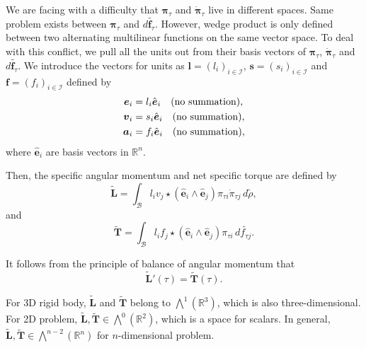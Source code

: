 \documentclass[preprint,12pt]{elsarticle}
\numberwithin{equation}{section}
\renewcommand{\u}[1]{\boldsymbol{#1}}
\renewcommand{\c}[1]{\mathcal{#1}}
\newcommand{\tu}[1]{\tilde{\u{ #1}}}
\begin{document}
We are facing with a difficulty that $\boldsymbol{\pi}_{\tau}$ and $\dot{\boldsymbol{\pi}}_{\tau}$ live in different spaces. Same problem exists between $\boldsymbol{\pi}_{\tau}$ and $d\tilde{\boldsymbol{f}_{\tau}}$. However, wedge product is only defined between two alternating multilinear functions on the same vector space. To deal with this conflict, we pull all the units out from their basis vectors of $\boldsymbol{\pi}_{\tau}$, $\dot{\boldsymbol{\pi}}_{\tau}$ and $d\tilde{\boldsymbol{f}_{\tau}}$. We introduce the vectors for units as $\u l = (l_i)_{i \in  \c I }$, $\u s = (s_i)_{i \in  \c I }$ and $\u f = (f_i)_{i \in  \c I }$ defined by 
\begin{align*}
\u e_i & = l_i  \hat{\u e}_i \quad \rm(no\ summation), \\
\u v_i & = s_i  \hat{\u e}_i \quad \rm(no\ summation), \\
\u a_i & = f_i  \hat{\u e}_i \quad \rm(no\ summation),
 \end{align*} 
 where $\hat{\u e}_i$ are basis vectors in $\mathbb{R}^n$.

Then, the specific angular momentum and net specific torque are defined by
\begin{equation}
\label{eq:rightAM}
\tilde{\boldsymbol{L}} = \int_{\mathcal{B}}  l_i v_j \star\left(\hat{\u e}_i \wedge  \hat{\u e}_j\right){\pi}_{\tau i} \dot{{\pi}}_{\tau j}   \, d\tilde{\rho},
\end{equation}
and
\begin{equation}
\label{eq:rightNT}
\tilde{\boldsymbol{T}} = \int_{\mathcal{B}} l_i f_j  \star\left(\hat{\u e}_i \wedge  \hat{\u e}_j\right) {\pi}_{\tau i}  \, d\tilde{f_{\tau j}} .
\end{equation}

It follows from the principle of balance of angular momentum that
\begin{equation}
\tu{L}'(\tau) = \tu{T}(\tau).
\label{eq:DefAMBtensorCoeff}
\end{equation}

For 3D rigid body, $\tu{L} $ and $\tu{T}$ belong to $\bigwedge^1(\mathbb{R}^3)$, which is also three-dimensional. For 2D problem, $\tu{L},\tu{T} \in \bigwedge^0(\mathbb{R}^2) $, which is a space for scalars. In general, $\tu{L},\tu{T} \in \bigwedge^{n-2}(\mathbb{R}^n) $ for $n$-dimensional problem.
\end{document}
